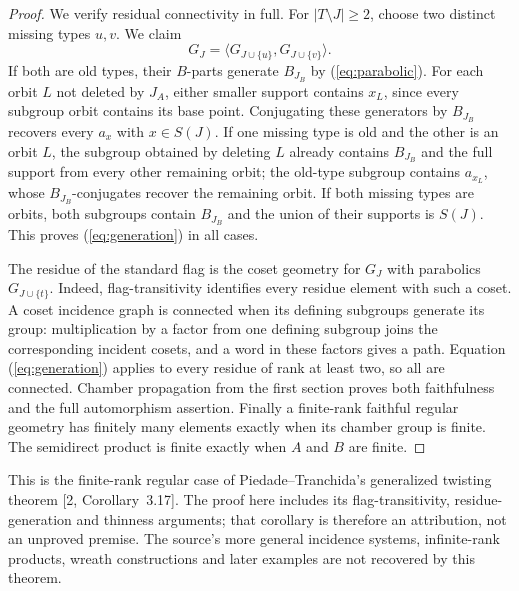 \begin{proof}
We verify residual connectivity in full. For $|T\setminus J|\geq2$, choose two distinct missing types $u,v$. We claim
\begin{equation}\label{eq:generation}
G_J=\langle G_{J\cup\{u\}},G_{J\cup\{v\}}\rangle.
\end{equation}
If both are old types, their $B$-parts generate $B_{J_B}$ by (\ref{eq:parabolic}). For each orbit $L$ not deleted by $J_A$, either smaller support contains $x_L$, since every subgroup orbit contains its base point. Conjugating these generators by $B_{J_B}$ recovers every $a_x$ with $x\in S(J)$. If one missing type is old and the other is an orbit $L$, the subgroup obtained by deleting $L$ already contains $B_{J_B}$ and the full support from every other remaining orbit; the old-type subgroup contains $a_{x_L}$, whose $B_{J_B}$-conjugates recover the remaining orbit. If both missing types are orbits, both subgroups contain $B_{J_B}$ and the union of their supports is $S(J)$. This proves (\ref{eq:generation}) in all cases.

The residue of the standard flag is the coset geometry for $G_J$ with parabolics $G_{J\cup\{t\}}$. Indeed, flag-transitivity identifies every residue element with such a coset. A coset incidence graph is connected when its defining subgroups generate its group: multiplication by a factor from one defining subgroup joins the corresponding incident cosets, and a word in these factors gives a path. Equation (\ref{eq:generation}) applies to every residue of rank at least two, so all are connected. Chamber propagation from the first section proves both faithfulness and the full automorphism assertion. Finally a finite-rank faithful regular geometry has finitely many elements exactly when its chamber group is finite. The semidirect product is finite exactly when $A$ and $B$ are finite.
\end{proof}

This is the finite-rank regular case of Piedade--Tranchida's generalized twisting theorem [2, Corollary~3.17]. The proof here includes its flag-transitivity, residue-generation and thinness arguments; that corollary is therefore an attribution, not an unproved premise. The source's more general incidence systems, infinite-rank products, wreath constructions and later examples are not recovered by this theorem.

